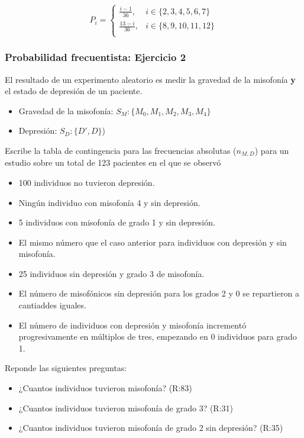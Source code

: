 \documentclass[
]{book}
\providecommand{\tightlist}{%
  \setlength{\itemsep}{0pt}\setlength{\parskip}{0pt}}
\begin{document}
\[
    P_i= 
\begin{cases}
   \frac{i-1}{36},& i \in \{2,3,4,5,6, 7\} \\
\frac{13-i}{36},& i \in \{8,9,10,11,12\} \\ 
\end{cases}
\]

\hypertarget{probabilidad-frecuentista-ejercicio-2}{%
\subsubsection{Probabilidad frecuentista: Ejercicio 2}\label{probabilidad-frecuentista-ejercicio-2}}

El resultado de un experimento aleatorio es medir la gravedad de la misofonía \textbf{y} el estado de depresión de un paciente.

\begin{itemize}
\tightlist
\item
  Gravedad de la misofonía: \(S_M:\{M_0,M_1,M_2,M_3,M_4\}\)
\item
  Depresión: \(S_D:\{D', D\}\))
\end{itemize}

Escribe la tabla de contingencia para las frecuencias absolutas (\(n_{M,D}\)) para un estudio sobre un total de 123 pacientes en el que se observó

\begin{itemize}
\tightlist
\item
  100 individuos no tuvieron depresión.
\item
  Ningún individuo con misofonía 4 y sin depresión.
\item
  5 individuos con misofonía de grado 1 y sin depresión.
\item
  El mismo número que el caso anterior para individuos con depresión y sin misofonía.
\item
  25 individuos sin depresión y grado 3 de misofonía.
\item
  El número de misofónicos sin depresión para los grados 2 y 0 se repartieron a cantiaddes iguales.
\item
  El número de individuos con depresión y misofonía incrementó progresivamente
  en múltiplos de tres, empezando en 0 individuos para grado 1.
\end{itemize}

Reponde las siguientes preguntas:

\begin{itemize}
\tightlist
\item
  ¿Cuantos individuos tuvieron misofonía? (R:83)
\item
  ¿Cuantos individuos tuvieron misofonía de grado 3? (R:31)
\item
  ¿Cuantos individuos tuvieron misofonía de grado 2 sin depresión? (R:35)
\end{itemize}
\end{document}
